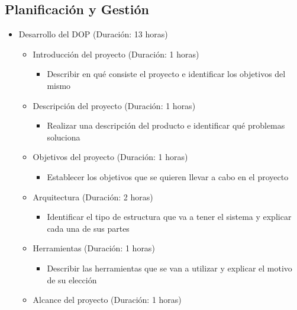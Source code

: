 \documentclass{report}
\begin{document}
            \subsection{Planificación y Gestión}
                \begin{itemize}
                    \item Desarrollo del DOP (Duración: 13 horas)
                    \begin{itemize}
                        \item Introducción del proyecto (Duración: 1 horas)
                        \begin{itemize}
                            \item Describir en qué consiste el proyecto e identificar los objetivos del mismo
                        \end{itemize}
                        \item Descripción del proyecto (Duración: 1 horas)
                        \begin{itemize}
                            \item Realizar una descripción del producto e identificar qué problemas soluciona
                        \end{itemize}
                        \item Objetivos del proyecto (Duración: 1 horas)
                        \begin{itemize}
                            \item Establecer los objetivos que se quieren llevar a cabo en el proyecto
                        \end{itemize}
                        \item Arquitectura (Duración: 2 horas)
                        \begin{itemize}
                            \item Identificar el tipo de estructura que va a tener el sistema y explicar cada una de sus partes
                        \end{itemize}
                        \item Herramientas (Duración: 1 horas)
                        \begin{itemize}
                            \item Describir las herramientas que se van a utilizar y explicar el motivo de su elección
                        \end{itemize}
                        \item Alcance del proyecto (Duración: 1 horas)

\end{itemize}
\end{itemize}
\end{document}
